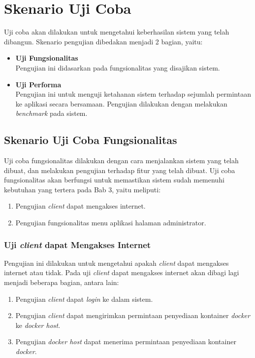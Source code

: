    
\section{Skenario Uji Coba} \label{skenarioujicoba}
	Uji coba akan dilakukan untuk mengetahui keberhasilan sistem yang telah dibangun. Skenario pengujian dibedakan menjadi 2 bagian, yaitu:
    \begin{itemize}
    \item \textbf{Uji Fungsionalitas} \\
    	Pengujian ini didasarkan pada fungsionalitas yang disajikan sistem.
    \item \textbf{Uji Performa} \\
    	Pengujian ini untuk menguji ketahanan sistem terhadap sejumlah permintaan ke aplikasi secara bersamaan. Pengujian dilakukan dengan melakukan \textit{benchmark} pada sistem.
    \end{itemize}
    
\subsection{Skenario Uji Coba Fungsionalitas}
Uji coba fungsionalitas dilakukan dengan cara menjalankan sistem yang telah dibuat, dan melakukan pengujian terhadap fitur yang telah dibuat. Uji coba fungsionalitas akan berfungsi untuk memastikan sistem sudah memenuhi kebutuhan yang tertera pada Bab 3, yaitu meliputi:

\begin{enumerate}
\item Pengujian \textit{client} dapat mengakses internet.
\item Pengujian fungsionalitas menu aplikasi halaman administrator.
\end{enumerate}

\subsubsection{Uji \textit{client} dapat Mengakses Internet} \label{keempat}
Pengujian ini dilakukan untuk mengetahui apakah \textit{client} dapat mengakses internet atau tidak. Pada uji \textit{client} dapat mengakses internet akan dibagi lagi menjadi beberapa bagian, antara lain:
\begin{enumerate}
\item Pengujian \textit{client} dapat \textit{login} ke dalam sistem.
\item Pengujian \textit{client} dapat mengirimkan permintaan penyediaan kontainer \textit{docker} ke \textit{docker host}.
\item Pengujian \textit{docker host} dapat menerima permintaan penyediaan kontainer \textit{docker}.
\end{enumerate}

